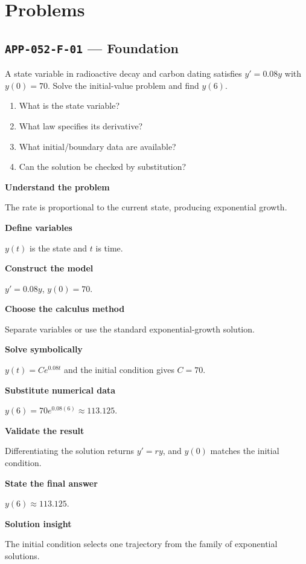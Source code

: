 \documentclass[11pt]{book}
\newcommand{\pid}[1]{\texttt{#1}}
\begin{document}
\section*{Problems}
\subsection*{\pid{APP-052-F-01} — Foundation}
\begin{problembox}
A state variable in radioactive decay and carbon dating satisfies $y'=0.08y$ with $y(0)=70$. Solve the initial-value problem and find $y(6)$.
\end{problembox}
\begin{promptbox}\begin{enumerate}
\item What is the state variable?
\item What law specifies its derivative?
\item What initial/boundary data are available?
\item Can the solution be checked by substitution?
\end{enumerate}\end{promptbox}
\begin{solutionbox}
\textbf{Understand the problem}\par The rate is proportional to the current state, producing exponential growth.\par\medskip
\textbf{Define variables}\par $y(t)$ is the state and $t$ is time.\par\medskip
\textbf{Construct the model}\par $y'=0.08y$, $y(0)=70$.\par\medskip
\textbf{Choose the calculus method}\par Separate variables or use the standard exponential-growth solution.\par\medskip
\textbf{Solve symbolically}\par $y(t)=Ce^{0.08t}$ and the initial condition gives $C=70$.\par\medskip
\textbf{Substitute numerical data}\par $y(6)=70e^{0.08(6)}\approx 113.125$.\par\medskip
\textbf{Validate the result}\par Differentiating the solution returns $y'=ry$, and $y(0)$ matches the initial condition.\par\medskip
\textbf{State the final answer}\par $y(6)\approx 113.125$.\par\medskip
\textbf{Solution insight}\par The initial condition selects one trajectory from the family of exponential solutions.\par\medskip
\end{solutionbox}
\end{document}
